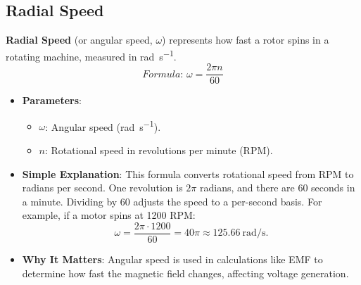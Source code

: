 \documentclass[12pt]{article}
\newcommand{\concept}[1]{\textbf{#1}}
\newcommand{\formula}[1]{\textit{Formula: }#1}
\begin{document}
\subsection{Radial Speed}
\concept{Radial Speed} (or angular speed, \(\omega\)) represents how fast a rotor spins in a rotating machine, measured in \si{\radian\per\second}.
\[
\formula{\omega = \frac{2 \pi n}{60}}
\]
\begin{itemize}
    \item \textbf{Parameters}:
        \begin{itemize}
            \item \(\omega\): Angular speed (\si{\radian\per\second}).
            \item \(n\): Rotational speed in revolutions per minute (RPM).
        \end{itemize}
    \item \textbf{Simple Explanation}: This formula converts rotational speed from RPM to radians per second. One revolution is \(2\pi\) radians, and there are 60 seconds in a minute. Dividing by 60 adjusts the speed to a per-second basis. For example, if a motor spins at 1200 RPM:
        \[
        \omega = \frac{2 \pi \cdot 1200}{60} = 40\pi \approx \SI{125.66}{\radian\per\second}.
        \]
    \item \textbf{Why It Matters}: Angular speed is used in calculations like EMF to determine how fast the magnetic field changes, affecting voltage generation.
\end{itemize}
\end{document}
